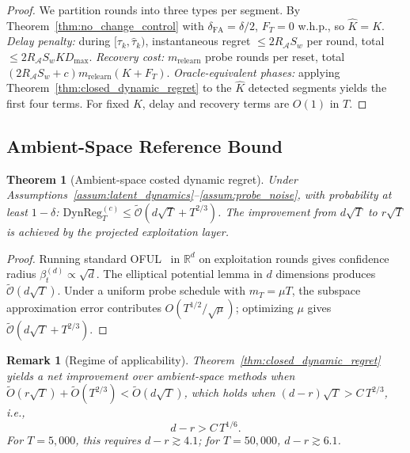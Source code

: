 \documentclass[11pt]{article}
\newcommand{\R}{\mathbb{R}}
\newcommand{\cA}{\mathcal{A}}
\newcommand{\tilO}{\widetilde{\mathcal{O}}}
\newcommand{\DynReg}{\mathrm{DynReg}}
\newtheorem{theorem}{Theorem}
\newtheorem{remark}{Remark}
\begin{document}
\begin{proof}
We partition rounds into three types per segment.
By Theorem~\ref{thm:no_change_control} with $\delta_{\mathrm{FA}}=\delta/2$,
$F_T=0$ w.h.p., so $\hat{K}=K$.
\emph{Delay penalty:} during $[\tau_k,\hat\tau_k)$, instantaneous regret
$\le 2R_{\cA}S_w$ per round, total $\le 2R_{\cA}S_wKD_{\max}$.
\emph{Recovery cost:} $m_{\mathrm{relearn}}$ probe rounds per reset, total
$(2R_{\cA}S_w{+}c)m_{\mathrm{relearn}}(K{+}F_T)$.
\emph{Oracle-equivalent phases:} applying
Theorem~\ref{thm:closed_dynamic_regret} to the $\hat{K}$ detected segments
yields the first four terms.
For fixed $K$, delay and recovery terms are $O(1)$ in $T$.
\end{proof}

\subsection{Ambient-Space Reference Bound}
\label{sec:ambient}

\begin{theorem}[Ambient-space costed dynamic regret]
\label{thm:ambient_regret}
Under Assumptions~\ref{assum:latent_dynamics}--\ref{assum:probe_noise},
with probability at least $1-\delta$:
$\DynReg_T^{(c)}\le\tilO(d\sqrt{T}+T^{2/3})$.
The improvement from $d\sqrt{T}$ to $r\sqrt{T}$ is achieved by the projected
exploitation layer.
\end{theorem}

\begin{proof}
Running standard OFUL~\citep{abbasi2011improved} in $\R^d$ on exploitation rounds
gives confidence radius $\beta_t^{(d)}\propto\sqrt{d}$.
The elliptical potential lemma in $d$ dimensions produces $\tilO(d\sqrt{T})$.
Under a uniform probe schedule with $m_T=\mu T$, the subspace approximation error
contributes $O(T^{1/2}/\sqrt{\mu})$; optimizing $\mu$ gives $\tilO(d\sqrt{T}+T^{2/3})$.
\end{proof}

\begin{remark}[Regime of applicability]
\label{rem:regime}
Theorem~\ref{thm:closed_dynamic_regret} yields a net improvement over ambient-space
methods when
$\widetilde{O}(r\sqrt{T})+\widetilde{O}(T^{2/3})
<\widetilde{O}(d\sqrt{T})$,
which holds when $(d{-}r)\sqrt{T}>C\,T^{2/3}$, i.e.,
\begin{equation}
  d-r > C\,T^{1/6}.
  \label{eq:regime_condition}
\end{equation}
For $T=5{,}000$, this requires $d-r\gtrsim 4.1$; for $T=50{,}000$,
$d-r\gtrsim 6.1$.
\end{remark}
\end{document}
